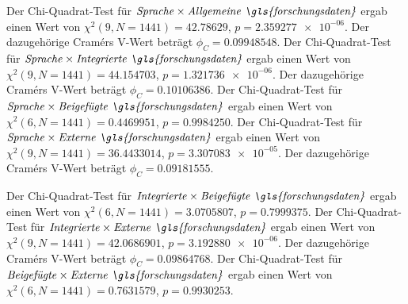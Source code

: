 Der Chi-Quadrat-Test für $\text{\textit{Sprache}}\times\text{\textit{Allgemeine \gls{forschungsdaten}}}$ ergab einen Wert von $\chi^2 (\num{9}, N = \num{1441}) = \num[round-mode=places,round-precision=3]{42.78629}$, $p = \num[round-mode=places,round-precision=3]{2.359277e-06}$.
Der dazugehörige Cramérs V-Wert beträgt $\phi_C=\num[round-mode=places,round-precision=3]{0.09948548}$.
Der Chi-Quadrat-Test für $\text{\textit{Sprache}}\times\text{\textit{Integrierte \gls{forschungsdaten}}}$ ergab einen Wert von $\chi^2 (\num{9}, N = \num{1441}) = \num[round-mode=places,round-precision=3]{44.154703}$, $p = \num[round-mode=places,round-precision=3]{1.321736e-06}$.
Der dazugehörige Cramérs V-Wert beträgt $\phi_C=\num[round-mode=places,round-precision=3]{0.10106386}$.
Der Chi-Quadrat-Test für $\text{\textit{Sprache}}\times\text{\textit{Beigefügte \gls{forschungsdaten}}}$ ergab einen Wert von $\chi^2 (\num{6}, N = \num{1441}) = \num[round-mode=places,round-precision=3]{0.4469951}$, $p = \num[round-mode=places,round-precision=3]{0.9984250}$.
Der Chi-Quadrat-Test für $\text{\textit{Sprache}}\times\text{\textit{Externe \gls{forschungsdaten}}}$ ergab einen Wert von $\chi^2 (\num{9}, N = \num{1441}) = \num[round-mode=places,round-precision=3]{36.4433014}$, $p = \num[round-mode=places,round-precision=3]{3.307083e-05}$.
Der dazugehörige Cramérs V-Wert beträgt $\phi_C=\num[round-mode=places,round-precision=3]{0.09181555}$.

Der Chi-Quadrat-Test für $\text{\textit{Integrierte}}\times\text{\textit{Beigefügte \gls{forschungsdaten}}}$ ergab einen Wert von $\chi^2 (\num{6}, N = \num{1441}) = \num[round-mode=places,round-precision=3]{3.0705807}$, $p = \num[round-mode=places,round-precision=3]{0.7999375}$.
Der Chi-Quadrat-Test für $\text{\textit{Integrierte}}\times\text{\textit{Externe \gls{forschungsdaten}}}$ ergab einen Wert von $\chi^2 (\num{9}, N = \num{1441}) = \num[round-mode=places,round-precision=3]{42.0686901}$, $p = \num[round-mode=places,round-precision=3]{3.192880e-06}$.
Der dazugehörige Cramérs V-Wert beträgt $\phi_C=\num[round-mode=places,round-precision=3]{0.09864768}$.
Der Chi-Quadrat-Test für $\text{\textit{Beigefügte}}\times\text{\textit{Externe \gls{forschungsdaten}}}$ ergab einen Wert von $\chi^2 (\num{6}, N = \num{1441}) = \num[round-mode=places,round-precision=3]{0.7631579}$, $p = \num[round-mode=places,round-precision=3]{0.9930253}$.














